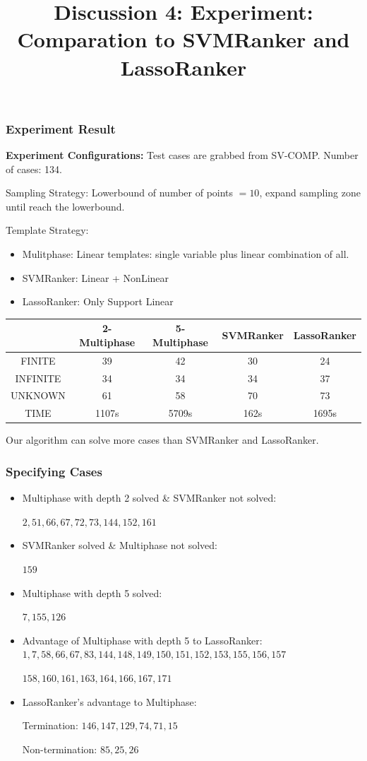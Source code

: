 \documentclass[10pt]{beamer}
\title{Discussion 4: Experiment: Comparation to SVMRanker and LassoRanker}
\begin{document}
\maketitle
\begin{frame}\frametitle{Experiment Result}
\textbf{Experiment Configurations:}
Test cases are grabbed from SV-COMP. Number of cases: 134.

Sampling Strategy: Lowerbound of number of points $=10$, expand sampling zone until reach the lowerbound.

Template Strategy: 
\begin{itemize}
\item Mulitphase: Linear templates: single variable plus linear combination of all.
\item SVMRanker: Linear + NonLinear
\item LassoRanker: Only Support Linear
\end{itemize}
\begin{center}
\begin{tabular}{|c|c|c|c|c|}
\hline
& 2-Multiphase& 5-Multiphase & SVMRanker & LassoRanker\\
\hline 
FINITE & 39 & 42&30 & 24\\
\hline 

INFINITE & 34& 34&34 & 37\\
\hline

UNKNOWN & 61& 58&70 & 73\\
\hline
TIME &1107s& 5709s& 162s& 1695s\\
\hline

\end{tabular}
\end{center}


Our algorithm can solve more cases than SVMRanker and LassoRanker.
\end{frame}


\begin{frame}\frametitle{Specifying Cases}
\begin{itemize}
\item Multiphase with depth 2 solved \& SVMRanker not solved:

$2,51,66,67,72,73,144,152,161$
\item SVMRanker solved \& Multiphase not solved:

$159$
\item Multiphase with depth 5 solved:

$7,155,126$
\item Advantage of Multiphase with depth 5 to LassoRanker:
$1,7,58,66,67,83,144,148,149,150,151,152,153,155,156,157$

$158,160,161,163,164,166,167,171$

\item LassoRanker's advantage to Multiphase:

Termination: $146,147,129,74,71,15$

Non-termination: $85,25,26$
\end{itemize}

\end{frame}
\end{document}
